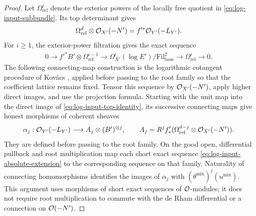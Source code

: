 \begin{proof}
Let $\Omega^i_{\mathrm{rel}}$ denote the exterior powers of the
locally free quotient in \eqref{eq:log-input-subbundle}.  Its top
determinant gives
\begin{equation}\label{eq:log-input-top-identity}
 \Omega^d_{\mathrm{rel}}\otimes\mathcal O_{X'}(-N')
       =f'^*\mathcal O_{Y'}(-L_{Y'}).
\end{equation}
For $i\ge1$, the exterior-power filtration gives the exact sequence
\begin{equation}\label{eq:log-input-absolute-extension}
 \begin{split}
 0\longrightarrow f'^*B'\otimes\Omega^{i-1}_{\mathrm{rel}}
  \longrightarrow
  \Omega^i_{X'}(\log E')/\mathrm{Fil}_{\mathrm{base}}^2
  \longrightarrow\Omega^i_{\mathrm{rel}}
  \longrightarrow0.
 \end{split}
\end{equation}
The following connecting-map construction is the logarithmic cotangent
procedure of Kov\'acs \cite[\S1, Lemma~1.1]{KovacsFineModuli}, applied
before passing to the root family so that the coefficient lattice remains
fixed. Tensor this sequence by $\mathcal O_{X'}(-N')$, apply higher direct
images, and use the projection formula.  Starting with the unit
map into the direct image of \eqref{eq:log-input-top-identity},
its successive connecting maps give honest morphisms of coherent
sheaves
\begin{equation}\label{eq:log-input-coherent-iterates}
 \alpha_j:\mathcal O_{Y'}(-L_{Y'})\longrightarrow
 A_j\otimes(B')^{\otimes j},\qquad
 A_j=R^j f'_*(\Omega^{d-j}_{\mathrm{rel}}\otimes\mathcal O_{X'}(-N')).
\end{equation}
They are defined before passing to the root family.  On the good
open, differential pullback and root multiplication map each
short exact sequence \eqref{eq:log-input-absolute-extension} to
the corresponding sequence on that family.  Naturality of
connecting homomorphisms identifies the images of $\alpha_j$
with $(\theta^{\mathrm{mix}})^j(u^{\mathrm{mix}})$.  This argument
uses morphisms of short exact sequences of $\mathcal O$-modules; it
does not require root multiplication to commute with the de Rham
differential or a connection on $\mathcal O(-N')$.


\end{proof}
